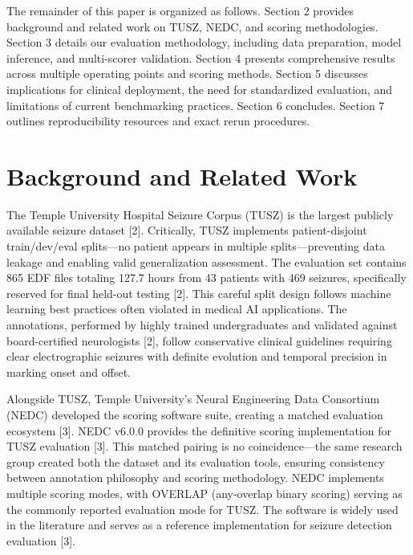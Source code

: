 \documentclass[
]{article}
\begin{document}
The remainder of this paper is organized as follows. Section 2 provides
background and related work on TUSZ, NEDC, and scoring methodologies.
Section 3 details our evaluation methodology, including data
preparation, model inference, and multi-scorer validation. Section 4
presents comprehensive results across multiple operating points and
scoring methods. Section 5 discusses implications for clinical
deployment, the need for standardized evaluation, and limitations of
current benchmarking practices. Section 6 concludes. Section 7 outlines
reproducibility resources and exact rerun procedures.

\hypertarget{background-and-related-work}{%
\section{Background and Related
Work}\label{background-and-related-work}}

The Temple University Hospital Seizure Corpus (TUSZ) is the largest
publicly available seizure dataset {[}2{]}. Critically, TUSZ implements
patient-disjoint train/dev/eval splits---no patient appears in multiple
splits---preventing data leakage and enabling valid generalization
assessment. The evaluation set contains 865 EDF files totaling 127.7
hours from 43 patients with 469 seizures, specifically reserved for
final held-out testing {[}2{]}. This careful split design follows
machine learning best practices often violated in medical AI
applications. The annotations, performed by highly trained
undergraduates and validated against board-certified neurologists
{[}2{]}, follow conservative clinical guidelines requiring clear
electrographic seizures with definite evolution and temporal precision
in marking onset and offset.

Alongside TUSZ, Temple University's Neural Engineering Data Consortium
(NEDC) developed the scoring software suite, creating a matched
evaluation ecosystem {[}3{]}. NEDC v6.0.0 provides the definitive
scoring implementation for TUSZ evaluation {[}3{]}. This matched pairing
is no coincidence---the same research group created both the dataset and
its evaluation tools, ensuring consistency between annotation philosophy
and scoring methodology. NEDC implements multiple scoring modes, with
OVERLAP (any-overlap binary scoring) serving as the commonly reported
evaluation mode for TUSZ. The software is widely used in the literature
and serves as a reference implementation for seizure detection
evaluation {[}3{]}.
\end{document}
